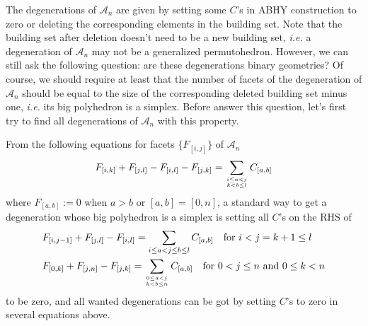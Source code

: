 \documentclass[hidelinks,12pt]{article}
\begin{document}
The degenerations of $\mathscr A_n$ are given by setting some $C$'s in ABHY construction to zero or deleting the corresponding elements in the building set. Note that the building set after deletion doesn't need to be a new building set, \emph{i.e.} a degeneration of $\mathscr A_n$ may not be a generalized permutohedron. However, we can still ask the following question: are these degenerations binary geometries? 
Of course, we should require at least that the number of facets of the degeneration of $\mathscr A_n$ should be equal to the size of the corresponding deleted building set minus one, \emph{i.e.} its big polyhedron is a simplex.
Before answer this question, let's first try to find all degenerations of $\mathscr A_n$ with this property.


From the following equations for facets $\{F_{[i,j]}\}$ of $\mathscr A_n$
\[
	F_{[i,k]}+F_{[j,l]}-F_{[i,l]}-F_{[j,k]}=
	\sum_{i\leq a<j\atop{k<b\leq l}} C_{[a,b]} 
\]
where $F_{[a,b]}:=0$ when $a>b$ or $[a,b]=[0,n]$,
a standard way to get a degeneration whose big polyhedron is a simplex is setting all $C$'s on the RHS of 
\begin{align}
&F_{[i,j-1]}+F_{[j,l]}-F_{[i,l]}= \sum_{i\leq a<j\leq b\leq l} C_{[a,b]} 
\quad \text{for $i<j=k+1\leq l$ }\\\nonumber
&F_{[0,k]}+F_{[j,n]}-F_{[j,k]}= \sum_{0\leq a<j\atop{k<b\leq n}} C_{[a,b]} 
\quad \text{for $0<j\leq n$ and $0\leq k<n$}
\end{align}
to be zero, and all wanted degenerations can be got by setting $C$'s to zero in several equations above. 
\end{document}
